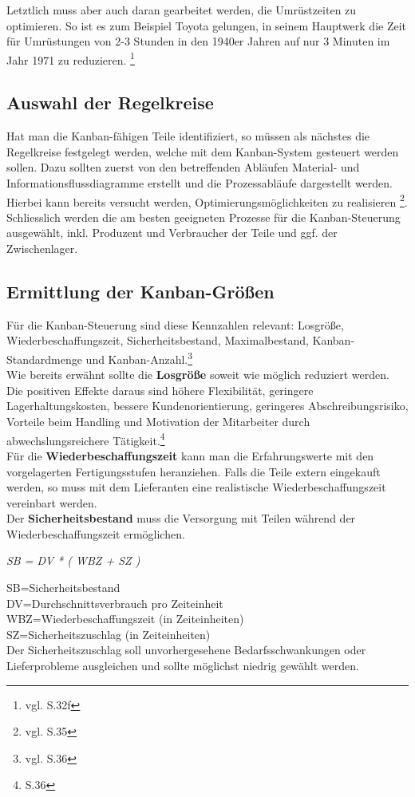 Letztlich muss aber auch daran gearbeitet werden, die Umrüstzeiten zu optimieren.
So ist es zum Beispiel Toyota gelungen, in seinem Hauptwerk die Zeit für Umrüstungen von 
2-3 Stunden in den 1940er Jahren auf nur 3 Minuten im Jahr 1971 zu reduzieren. \footnote{vgl. \cite{Ohno2013TPS} S.32f}

\subsection{Auswahl der Regelkreise}
Hat man die Kanban-fähigen Teile identifiziert, so müssen als nächstes die Regelkreise festgelegt werden, welche mit dem Kanban-System gesteuert werden sollen.
Dazu sollten zuerst von den betreffenden Abläufen Material- und Informationsflussdiagramme erstellt und die Prozessabläufe dargestellt werden.
Hierbei kann bereits versucht werden, Optimierungsmöglichkeiten zu realisieren \footnote{vgl. \cite{Geiger2011Kanban} S.35}. 
Schliesslich werden die am besten geeigneten Prozesse für die Kanban-Steuerung ausgewählt, 
inkl. Produzent und Verbraucher der Teile und ggf. der Zwischenlager.

\subsection{Ermittlung der Kanban-Größen}
Für die Kanban-Steuerung sind diese Kennzahlen relevant: Losgröße, Wiederbeschaffungszeit, 
Sicherheitsbestand, Maximalbestand, Kanban-Standardmenge und Kanban-Anzahl.\footnote{vgl. \cite{Geiger2011Kanban} S.36}\\

Wie bereits erwähnt sollte die \textbf{Losgröße} soweit wie möglich reduziert werden. Die positiven Effekte daraus sind  
höhere Flexibilität, geringere Lagerhaltungskosten, bessere Kundenorientierung, 
geringeres Abschreibungsrisiko, Vorteile beim Handling und Motivation der Mitarbeiter durch 
abwechslungsreichere Tätigkeit.\footnote{\cite{Geiger2011Kanban} S.36}\\

Für die \textbf{Wiederbeschaffungszeit} kann man die Erfahrungswerte mit den vorgelagerten Fertigungsstufen heranziehen.
Falls die Teile extern eingekauft werden, so muss mit dem Lieferanten eine realistische Wiederbeschaffungszeit vereinbart werden.\\

Der \textbf{Sicherheitsbestand} muss die Versorgung mit Teilen während der Wiederbeschaffungszeit ermöglichen.\\
\centerline{\textit{SB = DV * ( WBZ + SZ )}}
SB=Sicherheitsbestand\\
DV=Durchschnittsverbrauch pro Zeiteinheit\\
WBZ=Wiederbeschaffungszeit (in Zeiteinheiten)\\
SZ=Sicherheitszuschlag (in Zeiteinheiten)\\
Der Sicherheitszuschlag soll unvorhergesehene Bedarfsschwankungen oder Lieferprobleme
ausgleichen und sollte möglichst niedrig gewählt werden.\\

